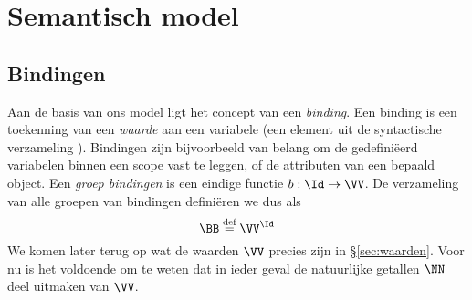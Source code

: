 \chapter{Semantisch model}

\section{Bindingen}\label{sec:bindinge}

Aan de basis van ons model ligt het concept van een \emph{binding}. Een binding is een toekenning van een \emph{waarde} aan een variabele (een element uit de syntactische verzameling \Id). Bindingen zijn bijvoorbeeld van belang om de gedefiniëerd variabelen binnen een scope vast te leggen, of de attributen van een bepaald object. Een \emph{groep bindingen} is een eindige functie $b : \Id \to \VV$. De verzameling van alle groepen van bindingen definiëren we dus als
\begin{equation*}
  \BB \DEF \VV^\Id
\end{equation*}
We komen later terug op wat de waarden $\VV$ precies zijn in §\ref{sec:waarden}. Voor nu is het voldoende om te weten dat in ieder geval de natuurlijke getallen $\NN$ deel uitmaken van $\VV$.


